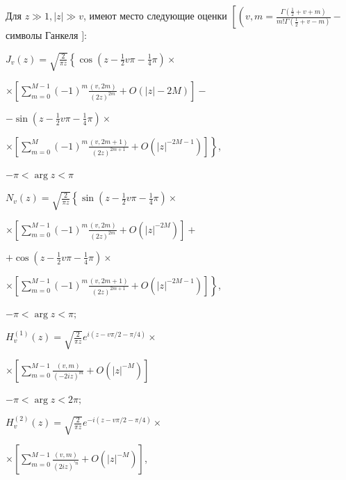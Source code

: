 \documentclass[10pt]{article}
\begin{document}
Для $z \gg 1,|z| \gg v$, имеют место следующие оценки $\left[\left(v, m=\frac{\Gamma\left(\frac{1}{2}+v+m\right)}{m ! \Gamma\left(\frac{1}{2}+v-m\right)}-\right.\right.$ символы Ганкеля $]:$



$J_{v}(z)=\sqrt{\frac{2}{\pi z}}\left\{\cos \left(z-\frac{1}{2} v \pi-\frac{1}{4} \pi\right) \times\right.$



$\times\left[\sum_{m=0}^{M-1}(-1)^{m} \frac{(v, 2 m)}{(2 z)^{2 m}}+O(|z|-2 M)\right]-$



$-\sin \left(z-\frac{1}{2} v \pi-\frac{1}{4} \pi\right) \times$



$\left.\times\left[\sum_{m=0}^{M}(-1)^{m} \frac{(v, 2 m+1)}{(2 z)^{2 m+1}}+O\left(|z|^{-2 M-1}\right)\right]\right\}$,



$-\pi<\arg z<\pi$



$N_{v}(z)=\sqrt{\frac{2}{\pi z}}\left\{\sin \left(z-\frac{1}{2} v \pi-\frac{1}{4} \pi\right) \times\right.$



$\times\left[\sum_{m=0}^{M-1}(-1)^{m} \frac{(v, 2 m)}{(2 z)^{2 m}}+O\left(|z|^{-2 M}\right)\right]+$



$+\cos \left(z-\frac{1}{2} v \pi-\frac{1}{4} \pi\right) \times$



$\left.\times\left[\sum_{m=0}^{M-1}(-1)^{m} \frac{(v, 2 m+1)}{(2 z)^{2 m+1}}+O\left(|z|^{-2 M-1}\right)\right]\right\}$,



$-\pi<\arg z<\pi ;$



$H_{v}^{(1)}(z)=\sqrt{\frac{2}{\pi z}} e^{i(z-v \pi / 2-\pi / 4)} \times$



$\times\left[\sum_{m=0}^{M-1} \frac{(v, m)}{(-2 i z)^{m}}+O\left(|z|^{-M}\right)\right]$



$-\pi<\arg z<2 \pi ;$



$H_{v}^{(2)}(z)=\sqrt{\frac{2}{\pi z}} e^{-i(z-v \pi / 2-\pi / 4)} \times$



$\times\left[\sum_{m=0}^{M-1} \frac{(v, m)}{(2 i z)^{\prime n}}+O\left(|z|^{-M}\right)\right]$,
\end{document}
